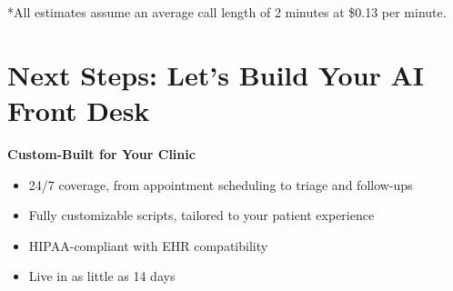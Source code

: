 \documentclass[12pt]{article}
\begin{document}
\vspace{0.4cm}
{\small **All estimates assume an average call length of 2 minutes at \$0.13 per minute.}

\vspace{0.5cm}

\section*{Next Steps: Let’s Build Your AI Front Desk}
\textbf{Custom-Built for Your Clinic}
\begin{itemize}
    \item 24/7 coverage, from appointment scheduling to triage and follow-ups
    \item Fully customizable scripts, tailored to your patient experience
    \item HIPAA-compliant with EHR compatibility
    \item Live in as little as 14 days
\end{itemize}

\vspace{0.4cm}
\begin{center}
\end{center}
\end{document}
